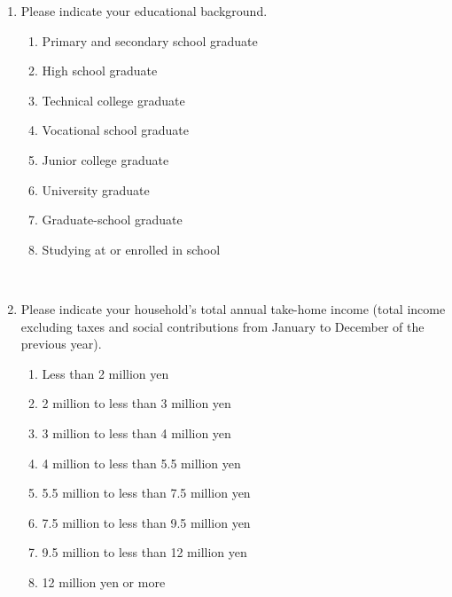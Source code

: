 \documentclass[a4paper,12pt]{article}
\begin{document}
\begin{enumerate}
\item[Q.14.] Please indicate your educational background.
	\begin{enumerate}[(1)]
	\item Primary and secondary school graduate
	\item High school graduate
	\item Technical college graduate
	\item Vocational school graduate
	\item Junior college graduate
	\item University graduate
	\item Graduate-school graduate
	\item Studying at or enrolled in school
	\end{enumerate}

\

\item[Q.15.] Please indicate your household's total annual take-home income (total
income excluding taxes and social contributions from January to December of the
previous year).
	\begin{enumerate}[(1)]
	\item Less than 2 million yen
	\item 2 million to less than 3 million yen
	\item 3 million to less than 4 million yen
	\item 4 million to less than 5.5 million yen
	\item 5.5 million to less than 7.5 million yen
	\item 7.5 million to less than 9.5 million yen
	\item 9.5 million to less than 12 million yen
	\item 12 million yen or more
	\end{enumerate}

\end{enumerate}

\bigskip
\end{document}
